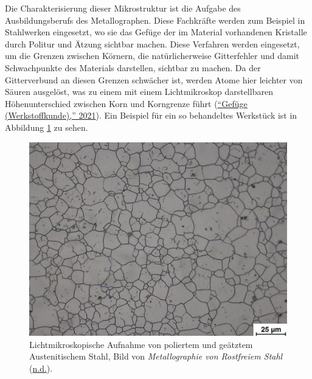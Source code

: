 \documentclass[
  12pt,
]{book}
\begin{document}
Die Charakterisierung dieser Mikrostruktur ist die Aufgabe des Ausbildungsberufs des Metallographen. Diese Fachkräfte werden zum Beispiel in Stahlwerken eingesetzt, wo sie das Gefüge der im Material vorhandenen Kristalle durch Politur und Ätzung sichtbar machen. Diese Verfahren werden eingesetzt, um die Grenzen zwischen Körnern, die natürlicherweise Gitterfehler und damit Schwachpunkte des Materials darstellen, sichtbar zu machen. Da der Gitterverbund an diesen Grenzen schwächer ist, werden Atome hier leichter von Säuren ausgelöst, was zu einem mit einem Lichtmikroskop darstellbaren Höhenunterschied zwischen Korn und Korngrenze führt (\protect\hyperlink{ref-GefugeWerkstoffkunde2021}{{``Gefüge (Werkstoffkunde),''} 2021}). Ein Beispiel für ein so behandeltes Werkstück ist in Abbildung \ref{fig:baseGrain} zu sehen.





\begin{figure}

{\centering \includegraphics[width=.8\textwidth]{../imgs/fig5} 

}

\caption[Lichtmikroskopische Aufnahme von Austenitischem Stahl.]{Lichtmikroskopische Aufnahme von poliertem und geätztem Austenitischem Stahl, Bild von \emph{Metallographie von Rostfreiem {Stahl}} (\protect\hyperlink{ref-MetallographieRostfreiemStahl}{n.d.}).}\label{fig:baseGrain}
\end{figure}
\end{document}
